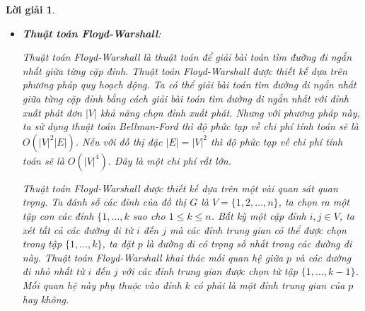 \documentclass[14pt, a4paper]{article}
\theoremstyle{sltheorem}
\theoremstyle{soltheorem}
\newtheorem*{loigiai}{Lời giải}
\begin{document}
\begin{loigiai}
\begin{itemize}
\begin{itemize}
                Để truy vết đường đi ta sử dụng thuật toán truy vết của thuật toán Bellman-Ford đã được trình bày ở thuật toán \ref{alg:Bellman-Ford-Trace}.
                Độ phức tạp của thuật toán Dijkstra là: Bước khởi tạo cần $\lvert V \rvert$ bước lặp.
                Bước lặp của thuật toán gồm 2 vòng lặp lồng nhau, vòng lặp while bên ngoài trường hợp xấu nhất phải duyệt qua $\lvert V \rvert$ đỉnh.
                Vòng lặp foreach bên trong số lượng sẽ giảm dần sau mỗi vòng lặp while bên ngoài. Nhưng trong trường hợp xấu nhất, đồ thị $G=(V, E)$ là đồ thị kết nối đầy đủ,
                ở bước lặp đầu tiên của vòng lặp while đầu tiên vòng lặp foreach bên trong cần $\lvert V \rvert - 1$ bước lặp.
                Sau mỗi bước lặp while vòng lặp foreach bên trong số lượng bước lặp giảm đi 1.
                Như vậy tổng số vòng lặp bên trong cùng là: $(\lvert V \rvert - 1) + (\lvert V \rvert - 2) + \dots + 1=\dfrac{\lvert V \rvert(\lvert V \rvert - 1)}{2} \sim O(\lvert V \rvert^2)$.
                Độ phức tạp của thuật toán Dijkstra là: $O(\lvert V \rvert + \lvert V \rvert^2)$

                \item \textbf{Thuật toán Floyd-Warshall}:
                
                Thuật toán Floyd-Warshall là thuật toán để giải bài toán tìm đường đi ngắn nhất giữa từng cặp đỉnh.
                Thuật toán Floyd-Warshall được thiết kế dựa trên phương pháp quy hoạch động.
                Ta có thể giải bài toán tìm đường đi ngắn nhất giữa từng cặp đỉnh bằng cách giải bài toán tìm đường đi ngắn nhất với đỉnh xuất phát đơn $\lvert V \rvert$ khả năng chọn đỉnh xuất phát.
                Nhưng với phương pháp này, ta sử dụng thuật toán Bellman-Ford thì độ phức tạp về chi phí tính toán sẽ là $O(\lvert V \rvert^2 \lvert E \rvert)$.
                Nếu với đồ thị đặc $\lvert E \rvert = \lvert V \rvert^2$ thì độ phức tạp về chi phí tính toán sẽ là $O(\lvert V \rvert^4)$.
                Đây là một chi phí rất lớn.

                Thuật toán Floyd-Warshall được thiết kế dựa trên một vài quan sát quan trọng.
                Ta đánh số các đỉnh của đồ thị $G$ là $V=\lbrace 1, 2, \dots, n \rbrace$, ta chọn ra một tập con các đỉnh
                $\lbrace 1, \dots, k$ sao cho $1 \leq k \leq n$. Bất kỳ một cặp đỉnh $i, j \in V$,
                ta xét tất cả các đường đi từ $i$ đến $j$ mà các đỉnh trung gian có thể được chọn trong tập $\lbrace 1, \dots, k \rbrace$,
                ta đặt $p$ là đường đi có trọng số nhất trong các đường đi này.
                Thuật toán Floyd-Warshall khai thác mối quan hệ giữa $p$ và các đường đi nhỏ nhất từ $i$ đến $j$ với các đỉnh trung gian được chọn từ tập $\lbrace 1, \dots, k - 1 \rbrace$.
                Mối quan hệ này phụ thuộc vào đỉnh $k$ có phải là một đỉnh trung gian của $p$ hay không.


\end{itemize}
\end{itemize}
\end{loigiai}
\end{document}
